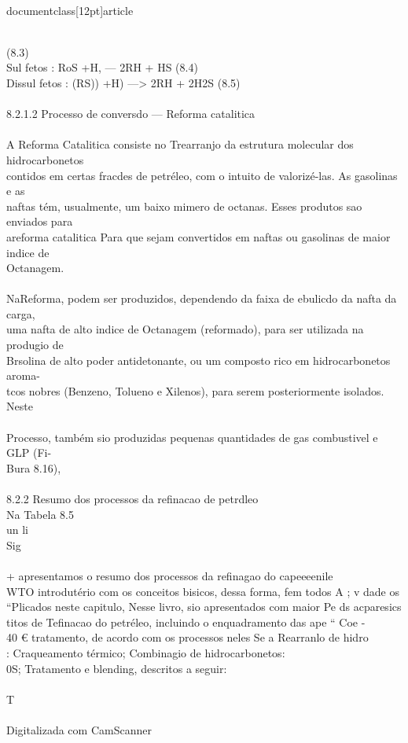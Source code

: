 \\documentclass[12pt]{article}
\begin{document}
\\
(8.3)\\
Sul fetos : RoS +H, — 2RH + HS (8.4)\\
Dissul fetos : (RS)) +H) —> 2RH + 2H2S (8.5)\\
\\
8.2.1.2 Processo de conversdo — Reforma catalitica\\
\\
A Reforma Catalitica consiste no Trearranjo da estrutura molecular dos hidrocarbonetos\\
contidos em certas fracdes de petréleo, com o intuito de valorizé-las. As gasolinas e as\\
naftas tém, usualmente, um baixo mimero de octanas. Esses produtos sao enviados para\\
areforma catalitica Para que sejam convertidos em naftas ou gasolinas de maior indice de\\
Octanagem.\\
\\
NaReforma, podem ser produzidos, dependendo da faixa de ebulicdo da nafta da carga,\\
uma nafta de alto indice de Octanagem (reformado), para ser utilizada na produgio de\\
Brsolina de alto poder antidetonante, ou um composto rico em hidrocarbonetos aroma-\\
tcos nobres (Benzeno, Tolueno e Xilenos), para serem posteriormente isolados. Neste\\
\\
Processo, também sio produzidas pequenas quantidades de gas combustivel e GLP (Fi-\\
Bura 8.16),\\
\\
8.2.2 Resumo dos processos da refinacao de petrdleo\\
Na Tabela 8.5\\
un li\\
Sig\\
\\
+ apresentamos o resumo dos processos da refinagao do  capeeeenile\\
WTO introdutério com os conceitos bisicos, dessa forma, fem todos A ; v dade os\\
“Plicados neste capitulo, Nesse livro, sio apresentados com maior Pe ds acparesics\\
titos de Tefinacao do petréleo, incluindo o enquadramento das ape “ Coe -\\
40 € tratamento, de acordo com os processos neles Se a Rearranlo de hidro\\
: Craqueamento térmico; Combinagio de hidrocarbonetos:\\
0S; Tratamento e blending, descritos a seguir:\\
\\
T\\
\\
Digitalizada com CamScanner\\
\end{document}
